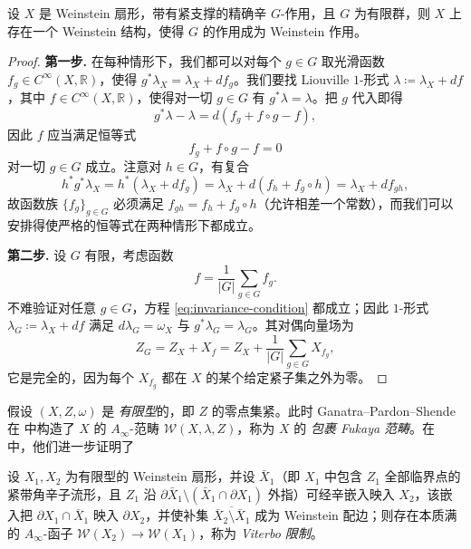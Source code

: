 \begin{lmm}
    设 $X$ 是 Weinstein 扇形，带有紧支撑的精确辛 $G$-作用，且 $G$ 为有限群，则 $X$ 上存在一个 Weinstein 结构，使得 $G$ 的作用成为 Weinstein 作用。
\end{lmm}

\begin{proof}
    \textbf{第一步.} 在每种情形下，我们都可以对每个 $g\in G$ 取光滑函数 $f_g\in C^{\infty} (X,\mathbb{R})$，使得 $g^{\ast}\lambda_X =\lambda_X +df_g$。我们要找 Liouville $1$-形式 $\lambda\coloneqq\lambda_X +df$，其中 $f\in C^{\infty}(X,\mathbb{R})$，使得对一切 $g\in G$ 有 $g^{\ast}\lambda =\lambda$。把 $g$ 代入即得
\[
        g^{\ast}\lambda -\lambda =d(f_g +f\circ g-f),
    \]
    因此 $f$ 应当满足恒等式
\begin{equation}\label{eq:invariance-condition}
        f_g +f\circ g-f=0
    \end{equation}
    对一切 $g\in G$ 成立。注意对 $h\in G$，有复合
\[
        h^{\ast}g^{\ast}\lambda_X =h^{\ast} (\lambda_X +df_g)=\lambda_X +d(f_h +f_g\circ h)=\lambda_X +df_{gh},
    \]
    故函数族 $\{f_g\}_{g\in G}$ 必须满足 $f_{gh}=f_h +f_g\circ h$（允许相差一个常数），而我们可以安排得使严格的恒等式在两种情形下都成立。\par
    \textbf{第二步.} 设 $G$ 有限，考虑函数
\[
        f=\frac{1}{\vert G\vert}\sum_{g\in G} f_g.
    \]
    不难验证对任意 $g\in G$，方程 \eqref{eq:invariance-condition} 都成立；因此 $1$-形式 $\lambda_G\coloneqq\lambda_X +df$ 满足 $d\lambda_G =\omega_X$ 与 $g^{\ast}\lambda_G =\lambda_G$。其对偶向量场为
\[
        Z_G =Z_X +X_f =Z_X+\frac{1}{\vert G\vert}\sum_{g\in G} X_{f_g},
    \]
    它是完全的，因为每个 $X_{f_g}$ 都在 $X$ 的某个给定紧子集之外为零。
\end{proof}

假设 $(X,Z,\omega)$ 是 \emph{有限型}的，即 $Z$ 的零点集紧。此时 Ganatra--Pardon--Shende 在 \cite{GPS20} 中构造了 $X$ 的 $A_{\infty}$-范畴 $\mathcal{W} (X,\lambda ,Z)$，称为 $X$ 的 \emph{包裹 Fukaya 范畴}。在 \cite{GPS24S} 中，他们进一步证明了

\begin{thm}[Viterbo 限制]\label{thm:Viterbo-restriction}
    设 $X_1, X_2$ 为有限型的 Weinstein 扇形，并设 $\bar{X}_1$（即 $X_1$ 中包含 $Z_1$ 全部临界点的紧带角辛子流形，且 $Z_1$ 沿 $\partial\bar{X}_1\setminus (\bar{X}_1\cap\partial X_1)$ 外指）可经辛嵌入映入 $X_2$，该嵌入把 $\partial X_1\cap\bar{X}_1$ 映入 $\partial X_2$，并使补集 $\overline{\bar{X}_2\setminus\bar{X}_1}$ 成为 Weinstein 配边；则存在本质满的 $A_{\infty}$-函子 $\mathcal{W} (X_2)\to\mathcal{W} (X_1)$，称为 \emph{Viterbo 限制}。
\end{thm}


